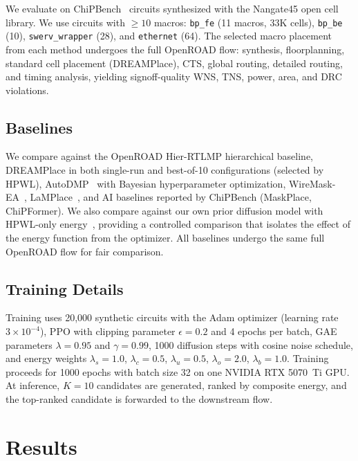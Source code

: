 \documentclass[sigconf,anonymous,review,9pt]{acmart}
\begin{document}
We evaluate on ChiPBench~\cite{chipbench2025} circuits synthesized with
the Nangate45 open cell library. We use circuits with $\geq 10$ macros:
\texttt{bp\_fe} (11 macros, 33K cells), \texttt{bp\_be} (10),
\texttt{swerv\_wrapper} (28), and \texttt{ethernet} (64). The selected
macro placement from each method undergoes the full OpenROAD flow:
synthesis, floorplanning, standard cell placement (DREAMPlace), CTS,
global routing, detailed routing, and timing analysis, yielding
signoff-quality WNS, TNS, power, area, and DRC violations.

\subsection{Baselines}

We compare against the OpenROAD Hier-RTLMP hierarchical baseline,
DREAMPlace in both single-run and best-of-10 configurations (selected by
HPWL), AutoDMP~\cite{autodmp2023} with Bayesian hyperparameter
optimization, WireMask-EA~\cite{shi2023wire},
LaMPlace~\cite{lamplace2025}, and AI baselines reported by ChiPBench
(MaskPlace, ChiPFormer). We also compare against our own prior diffusion
model with HPWL-only energy~\cite{chen2026dac}, providing a controlled
comparison that isolates the effect of the energy function from the
optimizer. All baselines undergo the same full OpenROAD flow for fair
comparison.

\subsection{Training Details}

Training uses 20,000 synthetic circuits with the Adam optimizer
(learning rate $3 \times 10^{-4}$), PPO with clipping parameter
$\epsilon = 0.2$ and 4 epochs per batch, GAE parameters $\lambda = 0.95$
and $\gamma = 0.99$, 1000 diffusion steps with cosine noise schedule,
and energy weights $\lambda_s = 1.0$, $\lambda_c = 0.5$,
$\lambda_u = 0.5$, $\lambda_o = 2.0$, $\lambda_b = 1.0$. Training
proceeds for 1000 epochs with batch size 32 on one NVIDIA RTX 5070~Ti
GPU. At inference, $K = 10$ candidates are generated, ranked by
composite energy, and the top-ranked candidate is forwarded to the
downstream flow.


\section{Results}
\label{sec:results}
\end{document}
